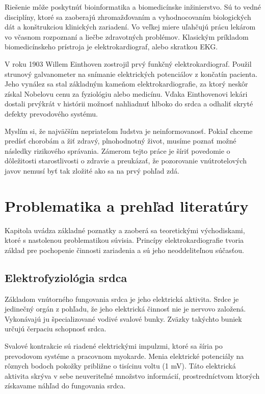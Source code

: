\documentclass[titlepage,12pt]{article}
\begin{document}
Riešenie môže poskytnúť bioinformatika a biomedicínske inžinierstvo. Sú to vedné disciplíny, ktoré sa zaoberajú zhromažďovaním a vyhodnocovaním biologických dát a konštrukciou klinických zariadení. Vo veľkej miere uľahčujú prácu lekárom vo včasnom rozpoznaní a liečbe zdravotných problémov. Klasickým príkladom biomedicínskeho prístroja je elektrokardiograf, alebo skratkou EKG. 

V roku 1903 Willem Einthoven zostrojil prvý funkčný elektrokardiograf. Použil strunový galvanometer na snímanie elektrických potenciálov z končatín pacienta. Jeho vynález sa stal základným kameňom elektrokardiografie, za ktorý neskôr získal Nobelovu cenu za fyziológiu alebo medicínu. Vďaka Einthovenovi lekári dostali prvýkrát v histórii možnosť nahliadnuť hlboko do srdca a odhaliť skryté defekty prevodového systému.

Myslím si, že najväčším nepriateľom ľudstva je neinformovanosť. Pokiaľ chceme predísť chorobám a žiť zdravý, plnohodnotný život, musíme poznať možné následky rizikového správania. Zámerom tejto práce je šíriť povedomie o dôležitosti starostlivosti o zdravie a preukázať, že pozorovanie vnútrotelových javov nemusí byť tak zložité ako sa na prvý pohľad zdá. 



\newpage
\section{Problematika a prehľad literatúry}
Kapitola uvádza základné poznatky a zaoberá sa teoretickými východiskami, ktoré s nastolenou problematikou súvisia. Princípy elektrokardiografie tvoria základ pre pochopenie činnosti zariadenia a sú jeho neoddeliteľnou súčasťou.


\subsection{Elektrofyziológia srdca}

Základom vnútorného fungovania srdca je jeho elektrická aktivita. Srdce je jedinečný orgán z pohľadu, že jeho elektrická činnosť nie je nervovo založená. Vykonávajú ju špecializované vodivé svalové bunky. Zväzky takýchto buniek určujú čerpaciu schopnosť srdca.

Svalové kontrakcie sú riadené elektrickými impulzmi, ktoré sa šíria po prevodovom systéme a pracovnom myokarde. Menia elektrické potenciály na rôznych bodoch pokožky približne \linebreak o tisícinu voltu (1 mV). Táto elektrická aktivita skrýva v sebe neuveriteľné množstvo informácií, prostredníctvom ktorých získavame náhľad do fungovania srdca.
\end{document}
